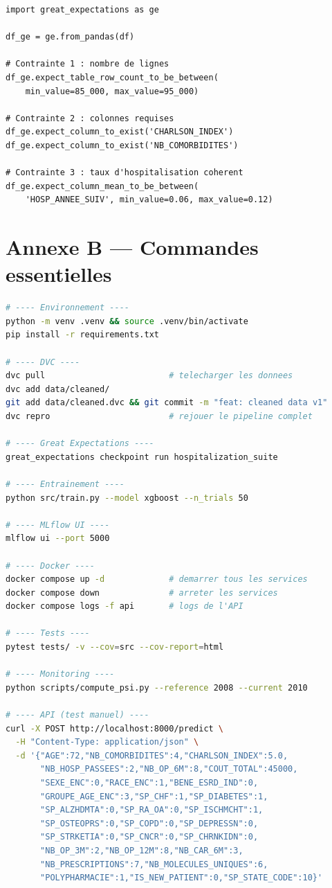 \begin{lstlisting}[caption={Expectations Great Expectations},
                   label={lst:ge}]
import great_expectations as ge

df_ge = ge.from_pandas(df)

# Contrainte 1 : nombre de lignes
df_ge.expect_table_row_count_to_be_between(
    min_value=85_000, max_value=95_000)

# Contrainte 2 : colonnes requises
df_ge.expect_column_to_exist('CHARLSON_INDEX')
df_ge.expect_column_to_exist('NB_COMORBIDITES')

# Contrainte 3 : taux d'hospitalisation coherent
df_ge.expect_column_mean_to_be_between(
    'HOSP_ANNEE_SUIV', min_value=0.06, max_value=0.12)
\end{lstlisting}

\section*{Annexe B --- Commandes essentielles}
\label{ann:commandes}

\begin{lstlisting}[language=bash, caption={Commandes principales du projet},
                   label={lst:commands}]
# ---- Environnement ----
python -m venv .venv && source .venv/bin/activate
pip install -r requirements.txt

# ---- DVC ----
dvc pull                         # telecharger les donnees
dvc add data/cleaned/
git add data/cleaned.dvc && git commit -m "feat: cleaned data v1"
dvc repro                        # rejouer le pipeline complet

# ---- Great Expectations ----
great_expectations checkpoint run hospitalization_suite

# ---- Entrainement ----
python src/train.py --model xgboost --n_trials 50

# ---- MLflow UI ----
mlflow ui --port 5000

# ---- Docker ----
docker compose up -d             # demarrer tous les services
docker compose down              # arreter les services
docker compose logs -f api       # logs de l'API

# ---- Tests ----
pytest tests/ -v --cov=src --cov-report=html

# ---- Monitoring ----
python scripts/compute_psi.py --reference 2008 --current 2010

# ---- API (test manuel) ----
curl -X POST http://localhost:8000/predict \
  -H "Content-Type: application/json" \
  -d '{"AGE":72,"NB_COMORBIDITES":4,"CHARLSON_INDEX":5.0,
       "NB_HOSP_PASSEES":2,"NB_OP_6M":8,"COUT_TOTAL":45000,
       "SEXE_ENC":0,"RACE_ENC":1,"BENE_ESRD_IND":0,
       "GROUPE_AGE_ENC":3,"SP_CHF":1,"SP_DIABETES":1,
       "SP_ALZHDMTA":0,"SP_RA_OA":0,"SP_ISCHMCHT":1,
       "SP_OSTEOPRS":0,"SP_COPD":0,"SP_DEPRESSN":0,
       "SP_STRKETIA":0,"SP_CNCR":0,"SP_CHRNKIDN":0,
       "NB_OP_3M":2,"NB_OP_12M":8,"NB_CAR_6M":3,
       "NB_PRESCRIPTIONS":7,"NB_MOLECULES_UNIQUES":6,
       "POLYPHARMACIE":1,"IS_NEW_PATIENT":0,"SP_STATE_CODE":10}'
\end{lstlisting}

